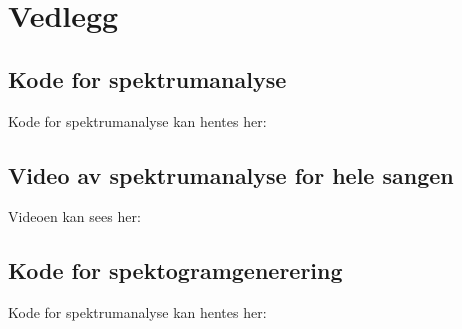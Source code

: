 \documentclass[12pt]{article}
\begin{document}
\appendix
\section*{Vedlegg}
\subsection*{Kode for spektrumanalyse}
\label{app:kode_spektrumanalyse}
Kode for spektrumanalyse kan hentes her: \url{}

\subsection*{Video av spektrumanalyse for hele sangen}
\label{app:video_spektrumanalyse}
Videoen kan sees her: \url{}

\subsection*{Kode for spektogramgenerering}
\label{app:kode_spektogramgenerering}
Kode for spektrumanalyse kan hentes her: \url{}
\end{document}
